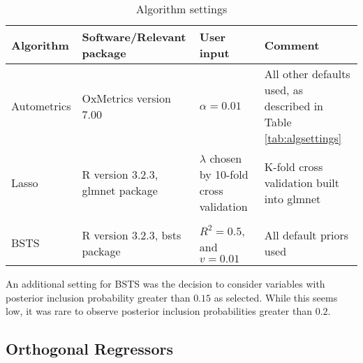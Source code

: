 \begin{table}[h]
\centering
\begin{tabular}{p{2cm}| p{3cm}| p{3cm}| p{3.5cm}}

\textbf{Algorithm}& \textbf{Software/Relevant package} & \textbf{User input} & \textbf{Comment}  \\
\hline
\small{Autometrics} & \small{OxMetrics version 7.00}&\small{$\alpha = 0.01$} & \small{All other defaults used, as described in Table \ref{tab:algsettings} } \\

\hline
\small{Lasso} & \small{R version 3.2.3, glmnet package} &\small{$\lambda$ chosen by 10-fold cross validation}& \small{K-fold cross validation built into glmnet}\\
& && \\
\hline
\small{BSTS} &\small{R version 3.2.3, bsts package} &\small{$R^{2} = 0.5$, and $v=0.01$} & \small{All default priors used} \\
\end{tabular}
\caption{Algorithm settings}
\label{AlgoSettings}
\end{table}
An additional setting for BSTS was the decision to consider variables with posterior inclusion probability greater than $0.15$ as selected. While this seems low, it was rare to observe posterior inclusion probabilities greater than $0.2$. 





\subsection{Orthogonal Regressors}

